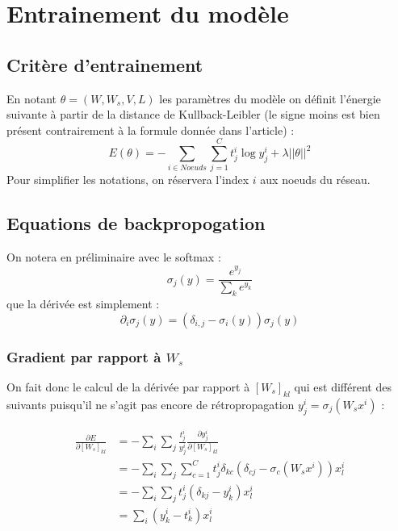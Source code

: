 \documentclass[conference]{IEEEtran}
\begin{document}




%
\IEEEpeerreviewmaketitle


\section{Entrainement du modèle}
\subsection{Critère d'entrainement}
En notant $\theta=(W,W_s,V,L)$ les paramètres du modèle on définit l'énergie suivante à partir de la distance de Kullback-Leibler (le signe moins est bien présent contrairement à la formule donnée dans l'article) :
$$E(\theta)=-\sum_{i\in Noeuds}\sum_{j=1}^C t^i_j\log y^i_j+\lambda ||\theta||^2$$
Pour simplifier les notations, on réservera l'index $i$ aux noeuds du réseau.

\subsection{Equations de backpropogation}
On notera en préliminaire avec le softmax :
$$\sigma_j(y)=\frac{e^{y_j}}{\sum_ k e^{y_k}}$$
que la dérivée est simplement :
$$\partial_i\sigma_j(y)=(\delta_{i,j}-\sigma_i(y))\sigma_j(y)$$

\subsubsection{Gradient par rapport à $W_s$}
On fait donc le calcul de la dérivée par rapport à $[W_s]_{kl}$ qui est différent des suivants puisqu'il ne s'agit pas encore de rétropropagation $y^i_j=\sigma_j(W_s x^i)$ :

\begin{align*}
\frac{\partial E}{\partial [W_s]_{kl}}&=-\sum_{i}\sum_j \frac{t_j^i}{y_j^i} \frac{\partial y_j^i}{\partial [W_s]_{kl}}\\
&=-\sum_i\sum_j \sum_{c=1}^C t_j^i\delta_{kc}(\delta_{cj}-\sigma_c(W_s x^i))x^i_l\\
&=-\sum_i\sum_j t_j^i (\delta_{kj}-y_k^i)x_l^i\\
&= \sum_i (y_k^i -t_k^i) x_l^i
\end{align*}
\end{document}

